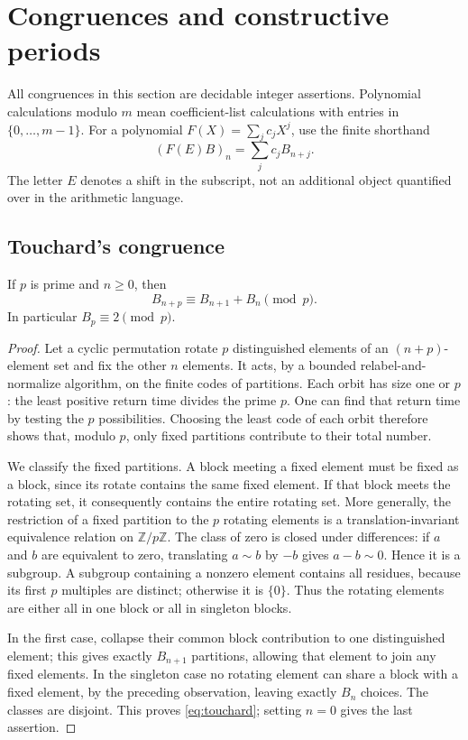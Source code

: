 \section{Congruences and constructive periods}
\label{sec:congruences}

All congruences in this section are decidable integer assertions.
Polynomial calculations modulo $m$ mean coefficient-list calculations with
entries in $\{0,\ldots,m-1\}$. For a polynomial $F(X)=\sum_jc_jX^j$, use the
finite shorthand
\[
 (F(E)B)_n=\sum_jc_jB_{n+j}.
\]
The letter $E$ denotes a shift in the subscript, not an additional object
quantified over in the arithmetic language.

\subsection{Touchard's congruence}

\begin{theorem}[Touchard]\label{thm:touchard}
If $p$ is prime and $n\geq0$, then
\begin{equation}\label{eq:touchard}
 B_{n+p}\equiv B_{n+1}+B_n\pmod p.
\end{equation}
In particular $B_p\equiv2\pmod p$.
\end{theorem}
\begin{proof}
Let a cyclic permutation rotate $p$ distinguished elements of an
$(n+p)$-element set and fix the other $n$ elements. It acts, by a bounded
relabel-and-normalize algorithm, on the finite codes of partitions. Each
orbit has size one or $p$: the least positive return time divides the prime
$p$. One can find that return time by testing the $p$ possibilities. Choosing
the least code of each orbit therefore shows that, modulo $p$, only fixed
partitions contribute to their total number.

We classify the fixed partitions. A block meeting a fixed element must be
fixed as a block, since its rotate contains the same fixed element. If that
block meets the rotating set, it consequently contains the entire rotating
set. More generally, the restriction of a fixed partition to the $p$
rotating elements is a translation-invariant equivalence relation on
$\mathbb Z/p\mathbb Z$. The class of zero is closed under differences:
if $a$ and $b$ are equivalent to zero, translating $a\sim b$ by $-b$ gives
$a-b\sim0$. Hence it is a subgroup. A subgroup containing a nonzero element
contains all residues, because its first $p$ multiples are distinct;
otherwise it is $\{0\}$. Thus the rotating elements are either all in one
block or all in singleton blocks.

In the first case, collapse their common block contribution to one
distinguished element; this gives exactly $B_{n+1}$ partitions, allowing that
element to join any fixed elements. In the singleton case no rotating element
can share a block with a fixed element, by the preceding observation, leaving
exactly $B_n$ choices. The classes are disjoint. This proves
\eqref{eq:touchard}; setting $n=0$ gives the last assertion.
\end{proof}

